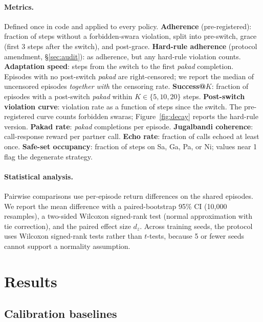 \documentclass[11pt]{article}
\newcommand{\sw}[1]{\textit{#1}}  %
\begin{document}
\paragraph{Metrics.} Defined once in code and applied to every policy.
\textbf{Adherence} (pre-registered): fraction of steps without a forbidden-swara violation, split into pre-switch, grace (first 3 steps after the switch), and post-grace.
\textbf{Hard-rule adherence} (protocol amendment, \S\ref{sec:audit}): as adherence, but any hard-rule violation counts.
\textbf{Adaptation speed}: steps from the switch to the first \sw{pakad} completion. Episodes with no post-switch \sw{pakad} are right-censored; we report the median of uncensored episodes \emph{together with} the censoring rate.
\textbf{Success@$K$}: fraction of episodes with a post-switch \sw{pakad} within $K\in\{5,10,20\}$ steps.
\textbf{Post-switch violation curve}: violation rate as a function of steps since the switch. The pre-registered curve counts forbidden swaras; Figure~\ref{fig:decay} reports the hard-rule version.
\textbf{Pakad rate}: \sw{pakad} completions per episode.
\textbf{Jugalbandi coherence}: call-response reward per partner call.
\textbf{Echo rate}: fraction of calls echoed at least once.
\textbf{Safe-set occupancy}: fraction of steps on Sa, Ga, Pa, or Ni; values near 1 flag the degenerate strategy.

\paragraph{Statistical analysis.} Pairwise comparisons use per-episode return differences on the shared episodes. We report the mean difference with a paired-bootstrap 95\% CI (10{,}000 resamples), a two-sided Wilcoxon signed-rank test (normal approximation with tie correction), and the paired effect size $d_z$. Across training seeds, the protocol uses Wilcoxon signed-rank tests rather than $t$-tests, because 5 or fewer seeds cannot support a normality assumption.

\section{Results}
\label{sec:results}

\subsection{Calibration baselines}
\label{sec:baselines}
\end{document}
